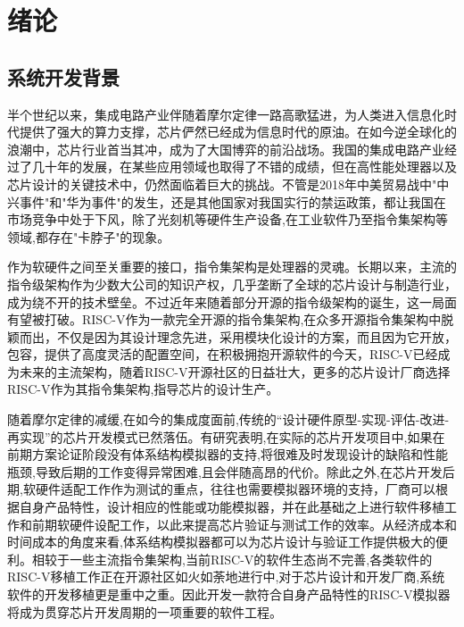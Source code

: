 
\chapter{绪论}

\section{系统开发背景}
半个世纪以来，集成电路产业伴随着摩尔定律一路高歌猛进，为人类进入信息化时代提供了强大的算力支撑，芯片俨然已经成为信息时代的原油。在如今逆全球化的浪潮中，芯片行业首当其冲，成为了大国博弈的前沿战场。我国的集成电路产业经过了几十年的发展，在某些应用领域也取得了不错的成绩，但在高性能处理器以及芯片设计的关键技术中，仍然面临着巨大的挑战\cite{huzhenbo,huzhenbo1}。不管是2018年中美贸易战中"中兴事件"和"华为事件"的发生，还是其他国家对我国实行的禁运政策，都让我国在市场竞争中处于下风，除了光刻机等硬件生产设备,在工业软件乃至指令集架构等领域,都存在"卡脖子"的现象。


作为软硬件之间至关重要的接口，指令集架构是处理器的灵魂。长期以来，主流的指令级架构作为少数大公司的知识产权，几乎垄断了全球的芯片设计与制造行业，成为绕不开的技术壁垒。不过近年来随着部分开源的指令级架构的诞生，这一局面有望被打破。RISC-V作为一款完全开源的指令集架构,在众多开源指令集架构中脱颖而出，不仅是因为其设计理念先进，采用模块化设计的方案，而且因为它开放，包容，提供了高度灵活的配置空间，在积极拥抱开源软件的今天，RISC-V已经成为未来的主流架构，随着RISC-V开源社区的日益壮大，更多的芯片设计厂商选择RISC-V作为其指令集架构,指导芯片的设计生产\cite{包云岗2022开源芯片生态技术体系构建面临的机遇与挑战}。

随着摩尔定律的减缓,在如今的集成度面前,传统的“设计硬件原型-实现-评估-改进-再实现”的芯片开发模式已然落伍\cite{jichengdu}。有研究表明,在实际的芯片开发项目中,如果在前期方案论证阶段没有体系结构模拟器的支持,将很难及时发现设计的缺陷和性能瓶颈,导致后期的工作变得异常困难,且会伴随高昂的代价\cite{buzhou}。除此之外,在芯片开发后期,软硬件适配工作作为测试的重点，往往也需要模拟器环境的支持\cite{黄聪会2012软件移植理论与技术研究,butko2012accuracy}，厂商可以根据自身产品特性，设计相应的性能或功能模拟器，并在此基础之上进行软件移植工作和前期软硬件设配工作，以此来提高芯片验证与测试工作的效率。从经济成本和时间成本的角度来看,体系结构模拟器都可以为芯片设计与验证工作提供极大的便利。相较于一些主流指令集架构,当前RISC-V的软件生态尚不完善,各类软件的RISC-V移植工作正在开源社区如火如荼地进行中,对于芯片设计和开发厂商,系统软件的开发移植更是重中之重。因此开发一款符合自身产品特性的RISC-V模拟器将成为贯穿芯片开发周期的一项重要的软件工程。


